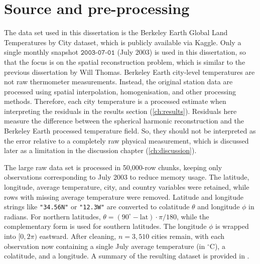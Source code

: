 \documentclass[11pt,a4paper]{report}
\begin{document}
\section{Source and pre-processing}

The data set used in this dissertation is the Berkeley Earth Global Land Temperatures by City dataset, which is publicly available via Kaggle. Only a single monthly snapshot $\texttt{2003-07-01}$ (July 2003) is used in this dissertation, so that the focus is on the spatial reconstruction problem, which is similar to the previous dissertation by Will Thomas. Berkeley Earth city-level temperatures are not raw thermometer measurements. Instead, the original station data are processed using spatial interpolation, homogenisation, and other processing methods. Therefore, each city temperature is a processed estimate when interpreting the residuals in the results section (\cref{ch:results}). Residuals here measure the difference between the spherical harmonic reconstruction and the Berkeley Earth processed temperature field. So, they should not be interpreted as the error relative to a completely raw physical measurement, which is discussed later as a limitation in the discussion chapter (\cref{ch:discussion}).

The large raw data set is processed in 50,000-row chunks, keeping only observations corresponding to July 2003 to reduce memory usage. The latitude, longitude, average temperature, city, and country variables were retained, while rows with missing average temperature were removed. Latitude and longitude strings like \texttt{"34.56N"} or \texttt{"12.3W"} are converted to colatitude $\theta$ and longitude $\phi$ in radians. For northern latitudes, $\theta = (90^\circ - \mathrm{lat})\cdot\pi/180$, while the complementary form is used for southern latitudes. The longitude $\phi$ is wrapped into $[0,2\pi)$ eastward. After cleaning, $n=3,510$ cities remain, with each observation now containing a single July average temperature (in $^\circ\mathrm{C}$), a colatitude, and a longitude. A summary of the resulting dataset is provided in . 
\end{document}
